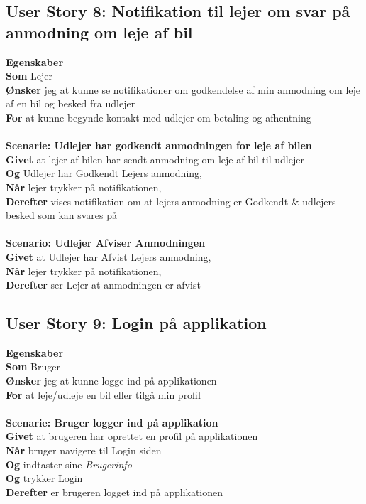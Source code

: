 \documentclass[Kravspecifikation/Kravspec_Main.tex]{subfiles}
\begin{document}
\subsection{User Story 8: Notifikation til lejer om svar på anmodning om leje af bil}
\textbf{Egenskaber}\\
\textbf{Som} Lejer \\
\textbf{Ønsker} jeg at kunne se notifikationer om godkendelse af min anmodning om leje af en bil og besked fra udlejer\\
\textbf{For} at kunne begynde kontakt med udlejer om betaling og afhentning
\\\\
\textbf{Scenarie: Udlejer har godkendt anmodningen for leje af bilen}\\
\textbf{Givet} at lejer af bilen har sendt anmodning om leje af bil til udlejer \\
\textbf{Og} Udlejer har Godkendt Lejers anmodning,\\
\textbf{Når} lejer trykker på notifikationen, \\
\textbf{Derefter} vises notifikation om at lejers anmodning er Godkendt \& udlejers besked som kan svares på \\\\
\textbf{Scenario: Udlejer Afviser Anmodningen}\\
\textbf{Givet} at Udlejer har Afvist Lejers anmodning,\\
\textbf{Når} lejer trykker på notifikationen,\\
\textbf{Derefter} ser Lejer at anmodningen er afvist

\subsection{User Story 9: Login på applikation}
\textbf{Egenskaber}\\
\textbf{Som} Bruger \\
\textbf{Ønsker} jeg at kunne logge ind på applikationen\\
\textbf{For} at leje/udleje en bil eller tilgå min profil
\\\\
\textbf{Scenarie: Bruger logger ind på applikation}\\
\textbf{Givet} at brugeren har oprettet en profil på applikationen\\
\textbf{Når} bruger navigere til Login siden \\
\textbf{Og} indtaster sine \textit{Brugerinfo}\\
\textbf{Og} trykker Login\\
\textbf{Derefter} er brugeren logget ind på applikationen
\end{document}
